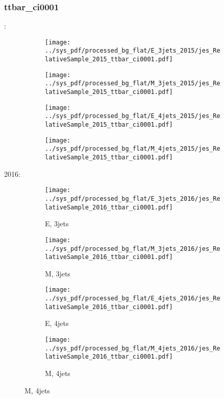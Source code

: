 \documentclass{beamer}
\begin{document}
\begin{frame}
\frametitle{ttbar_ci0001}
\fontsize{5}{1}:
\begin{figure}
\centering
\begin{subfigure}[b]{0.24\textwidth}
\texttt{[image: ../sys\_pdf/processed\_bg\_flat/E\_3jets\_2015/jes\_RelativeSample\_2015\_ttbar\_ci0001.pdf]}
\end{subfigure}
\begin{subfigure}[b]{0.24\textwidth}
\texttt{[image: ../sys\_pdf/processed\_bg\_flat/M\_3jets\_2015/jes\_RelativeSample\_2015\_ttbar\_ci0001.pdf]}
\end{subfigure}
\begin{subfigure}[b]{0.24\textwidth}
\texttt{[image: ../sys\_pdf/processed\_bg\_flat/E\_4jets\_2015/jes\_RelativeSample\_2015\_ttbar\_ci0001.pdf]}
\end{subfigure}
\begin{subfigure}[b]{0.24\textwidth}
\texttt{[image: ../sys\_pdf/processed\_bg\_flat/M\_4jets\_2015/jes\_RelativeSample\_2015\_ttbar\_ci0001.pdf]}
\end{subfigure}
\end{figure}
2016:
\begin{figure}
\centering
\begin{subfigure}[b]{0.24\textwidth}
\texttt{[image: ../sys\_pdf/processed\_bg\_flat/E\_3jets\_2016/jes\_RelativeSample\_2016\_ttbar\_ci0001.pdf]}
\captionsetup{font=tiny}
\caption{E, 3jets}
\end{subfigure}
\begin{subfigure}[b]{0.24\textwidth}
\texttt{[image: ../sys\_pdf/processed\_bg\_flat/M\_3jets\_2016/jes\_RelativeSample\_2016\_ttbar\_ci0001.pdf]}
\captionsetup{font=tiny}
\caption{M, 3jets}
\end{subfigure}
\begin{subfigure}[b]{0.24\textwidth}
\texttt{[image: ../sys\_pdf/processed\_bg\_flat/E\_4jets\_2016/jes\_RelativeSample\_2016\_ttbar\_ci0001.pdf]}
\captionsetup{font=tiny}
\caption{E, 4jets}
\end{subfigure}
\begin{subfigure}[b]{0.24\textwidth}
\texttt{[image: ../sys\_pdf/processed\_bg\_flat/M\_4jets\_2016/jes\_RelativeSample\_2016\_ttbar\_ci0001.pdf]}
\captionsetup{font=tiny}
\caption{M, 4jets}
\end{subfigure}
\end{figure}
\end{frame}
\end{document}

